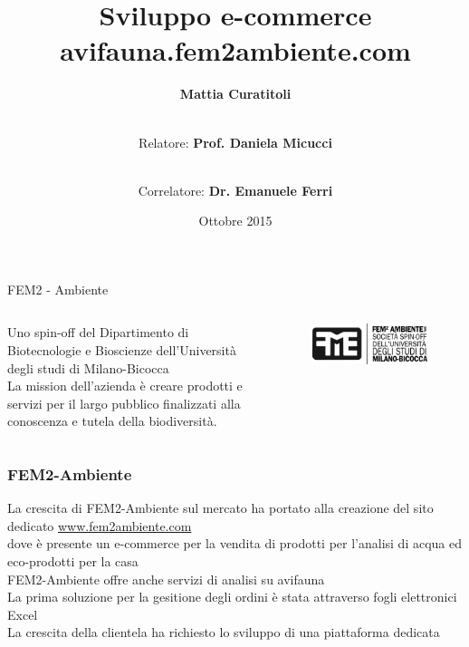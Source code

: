 \documentclass{beamer}
\title[avifauna.fem2ambiente]{Sviluppo e-commerce\\avifauna.fem2ambiente.com}
\author[Mattia Curatitoli]{\textbf{Mattia Curatitoli} \and \\[1cm] 
	Relatore: \textbf{Prof. Daniela Micucci} \and \\
	Correlatore: \textbf{Dr. Emanuele Ferri}}
\date{Ottobre 2015}
\def \fem {FEM2-Ambiente}
\begin{document}
\begin{frame}
 \maketitle
\end{frame}

\begin{frame}
 \begin{center}
  {\huge FEM2 - Ambiente}\\[1cm]
  \begin{columns}
    \begin{center}
	 Uno spin-off del Dipartimento di Biotecnologie e Bioscienze dell'Università degli studi di Milano-Bicocca \\[0.5cm]
     La mission dell'azienda è creare prodotti e servizi per il largo pubblico finalizzati alla conoscenza e tutela della biodiversità.    
    \end{center}
   \begin{figure}
    \includegraphics[scale=0.7]{images/fem}
   \end{figure}
  \end{columns}
 \end{center}
\end{frame}

\begin{frame}
 \frametitle{\fem}
 \begin{center}
  La crescita di {\fem} sul mercato ha portato alla creazione del sito dedicato \url{www.fem2ambiente.com} \\ 
  dove è presente un e-commerce per la vendita di prodotti per l'analisi di acqua ed eco-prodotti per la casa \\[1cm]
  {\fem} offre anche servizi di analisi su avifauna \\
  La prima soluzione per la gesitione degli ordini è stata attraverso fogli elettronici Excel \\
  La crescita della clientela ha richiesto lo sviluppo di una piattaforma dedicata
 \end{center}
\end{frame}
\end{document}
